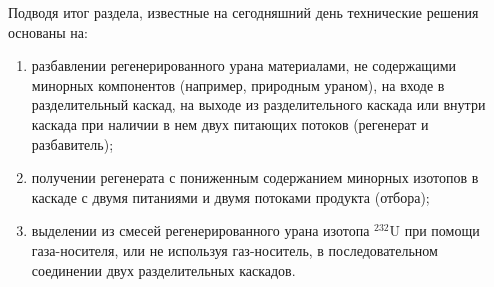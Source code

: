 Подводя итог раздела, известные на сегодняшний день технические решения основаны на:
\begin{enumerate}
  \item разбавлении регенерированного урана материалами, не содержащими минорных компонентов (например, природным ураном), на входе в разделительный каскад, на выходе из разделительного каскада или внутри каскада при наличии в нем двух питающих потоков (регенерат и разбавитель);
  \item получении регенерата с пониженным содержанием минорных изотопов в каскаде с двумя питаниями и двумя потоками продукта (отбора);
  \item выделении из смесей регенерированного урана изотопа $^{232}$U при помощи газа-носителя, или не используя газ-носитель, в последовательном соединении двух разделительных каскадов.
\end{enumerate}

